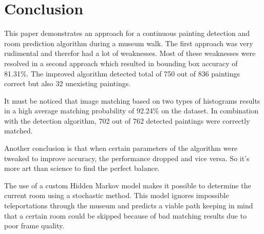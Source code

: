 \section{Conclusion}
\label{sec:conclusion}

This paper demonstrates an approach for a continuous painting detection and room prediction algorithm during a museum walk. The first approach was very rudimental and therefor had a lot of weaknesses. Most of these weaknesses were resolved in a second approach which resulted in bounding box accuracy of 81.31\%. The improved algorithm detected total of 750 out of 836 paintings correct but also 32 unexisting paintings.

It must be noticed that image matching based on two types of histograms results in a high average matching probability of 92.24\% on the dataset. In combination with the detection algorithm, 702 out of 762 detected paintings were correctly matched.

Another conclusion is that when certain parameters of the algorithm were tweaked to improve accuracy, the performance dropped and vice versa. So it's more art than science to find the perfect balance.

The use of a custom Hidden Markov model makes it possible to determine the current room using a stochastic method. This model ignores impossible teleportations through the museum and predicts a viable path keeping in mind that a certain room could be skipped because of bad matching results due to poor frame quality.

